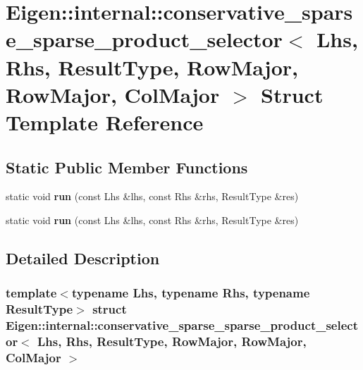 \hypertarget{struct_eigen_1_1internal_1_1conservative__sparse__sparse__product__selector_3_01_lhs_00_01_rhs_09c6df8c1cfe8f5011ca309f86919cf1f}{}\section{Eigen\+:\+:internal\+:\+:conservative\+\_\+sparse\+\_\+sparse\+\_\+product\+\_\+selector$<$ Lhs, Rhs, Result\+Type, Row\+Major, Row\+Major, Col\+Major $>$ Struct Template Reference}
\label{struct_eigen_1_1internal_1_1conservative__sparse__sparse__product__selector_3_01_lhs_00_01_rhs_09c6df8c1cfe8f5011ca309f86919cf1f}
\subsection*{Static Public Member Functions}
\begin{DoxyCompactItemize}
\item 
\mbox{\label{struct_eigen_1_1internal_1_1conservative__sparse__sparse__product__selector_3_01_lhs_00_01_rhs_09c6df8c1cfe8f5011ca309f86919cf1f_a19040dbd90c01e2ec84b612c629d71c7}} 
static void {\bfseries run} (const Lhs \&lhs, const Rhs \&rhs, Result\+Type \&res)
\item 
\mbox{\label{struct_eigen_1_1internal_1_1conservative__sparse__sparse__product__selector_3_01_lhs_00_01_rhs_09c6df8c1cfe8f5011ca309f86919cf1f_a19040dbd90c01e2ec84b612c629d71c7}} 
static void {\bfseries run} (const Lhs \&lhs, const Rhs \&rhs, Result\+Type \&res)
\end{DoxyCompactItemize}


\subsection{Detailed Description}
\subsubsection*{template$<$typename Lhs, typename Rhs, typename Result\+Type$>$\newline
struct Eigen\+::internal\+::conservative\+\_\+sparse\+\_\+sparse\+\_\+product\+\_\+selector$<$ Lhs, Rhs, Result\+Type, Row\+Major, Row\+Major, Col\+Major $>$}



